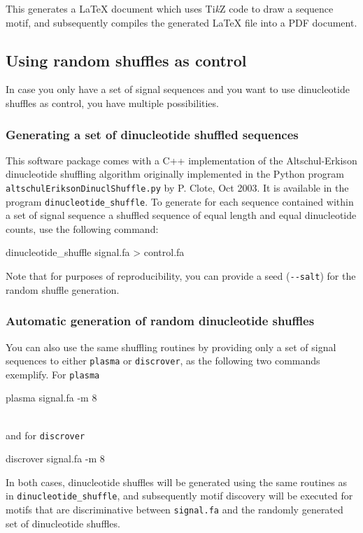 \documentclass[a4paper]{article}
\newcommand{\plasma}[0]{\texttt{plasma}}
\newcommand{\discrover}[0]{\texttt{discrover}}
\newcommand{\dinuclshuffle}[0]{\texttt{dinucleotide\_shuffle}}
\newcommand{\TikZ}{Ti\emph{k}Z}
\begin{document}
This generates a \LaTeX{} document which uses \TikZ{} code to draw a sequence motif, and subsequently compiles the generated \LaTeX{} file into a PDF document.

\subsection{Using random shuffles as control}
In case you only have a set of signal sequences and you want to use dinucleotide shuffles as control, you have multiple possibilities.
\subsubsection{Generating a set of dinucleotide shuffled sequences}
This software package comes with a C++ implementation of the Altschul-Erkison dinucleotide shuffling algorithm originally implemented in the Python program \verb|altschulEriksonDinuclShuffle.py| by P. Clote, Oct 2003.
It is available in the program \dinuclshuffle{}.
To generate for each sequence contained within a set of signal sequence a shuffled sequence of equal length and equal dinucleotide counts, use the following command:\\
\begin{verbbox}
dinucleotide_shuffle signal.fa > control.fa
\end{verbbox}
\fbox{\theverbbox[t]}

Note that for purposes of reproducibility, you can provide a seed (\verb|--salt|) for the random shuffle generation.

\subsubsection{Automatic generation of random dinucleotide shuffles}
You can also use the same shuffling routines by providing only a set of signal sequences to either \plasma{} or \discrover{}, as the following two commands exemplify.
For \plasma{}\\
\begin{verbbox}
plasma signal.fa -m 8
\end{verbbox}
\fbox{\theverbbox[t]}\\
and for \discrover{}\\
\begin{verbbox}
discrover signal.fa -m 8
\end{verbbox}
\fbox{\theverbbox[t]}

In both cases, dinucleotide shuffles will be generated using the same routines as in \dinuclshuffle{}, and subsequently motif discovery will be executed for motifs that are discriminative between \verb|signal.fa| and the randomly generated set of dinucleotide shuffles.
\end{document}
